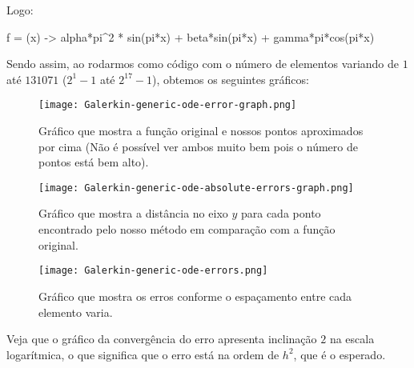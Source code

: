   Logo:

  \begin{code}
  f = (x) -> alpha*pi^2 * sin(pi*x) + beta*sin(pi*x) + gamma*pi*cos(pi*x)
  \end{code}

  Sendo assim, ao rodarmos como código com o número de elementos variando de $1$ até $131071$ ($2^1 - 1$ até $2^{17} - 1$), obtemos os seguintes gráficos:

  \begin{figure}[H]
    \centering
    \texttt{[image: Galerkin-generic-ode-error-graph.png]}
    \caption{Gráfico que mostra a função original e nossos pontos aproximados por cima (Não é possível ver ambos muito bem pois o número de pontos está bem alto).}
  \end{figure}

  \begin{figure}[H]
    \centering
    \texttt{[image: Galerkin-generic-ode-absolute-errors-graph.png]}
    \caption{Gráfico que mostra a distância no eixo $y$ para cada ponto encontrado pelo nosso método em comparação com a função original.}
  \end{figure}

  \begin{figure}[H]
    \centering
    \texttt{[image: Galerkin-generic-ode-errors.png]}
    \caption{Gráfico que mostra os erros conforme o espaçamento entre cada elemento varia.}
  \end{figure}

  Veja que o gráfico da convergência do erro apresenta inclinação $2$ na escala logarítmica, o que significa que o erro está na ordem de $h^2$, que é o esperado.


